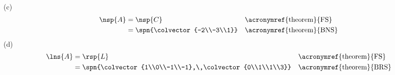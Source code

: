 %
(c)
%
\begin{align*}
\nsp{A}
&=\nsp{C}&&\text{\acronymref{theorem}{FS}}\\
&=\spn{\colvector{-2\\-3\\1}}&&\text{\acronymref{theorem}{BNS}}
\end{align*}
%
(d)
%
\begin{align*}
\lns{A}
&=\rsp{L}&&\text{\acronymref{theorem}{FS}}\\
&=\spn{\colvector{1\\0\\-1\\-1},\,\colvector{0\\1\\1\\3}}&&\text{\acronymref{theorem}{BRS}}
\end{align*}

